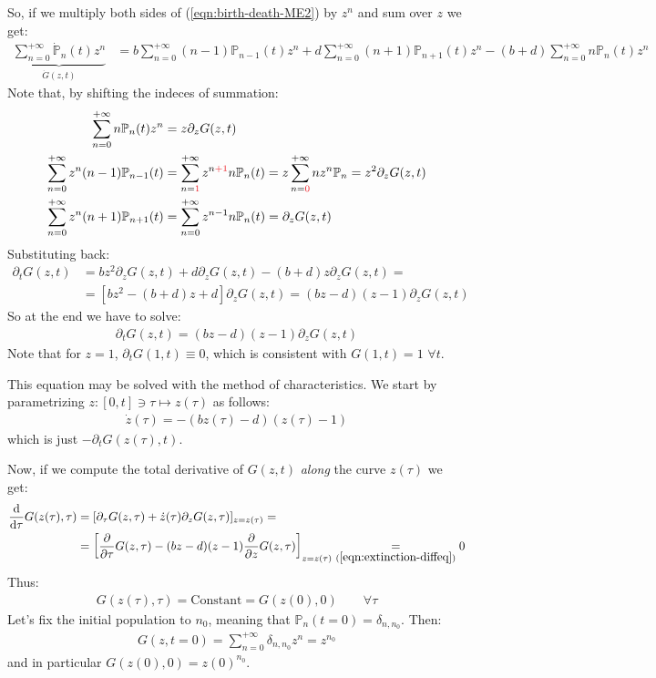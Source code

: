 \documentclass[../../main.tex]{subfiles}
\begin{document}
So, if we multiply both sides of (\ref{eqn:birth-death-ME2}) by $z^n$ and sum over $z$ we get:
\begin{align*}
    \underbrace{\sum_{n=0}^{+\infty} \dot{\mathbb{P}}_n(t) z^n}_{\dot{G}(z,t)}  &= b\sum_{n=0}^{+\infty} (n-1) \mathbb{P}_{n-1}(t) z^n + d\sum_{n=0}^{+\infty} (n+1) \mathbb{P}_{n+1}(t) z^n - (b+d)\sum_{n=0}^{+\infty} n \mathbb{P}_n(t) z^n
\end{align*}
Note that, by shifting the indeces of summation:
\begin{align*}
    \sum_{n=0}^{+\infty} n \mathbb{P}_n(t) z^n &= z\partial_z G(z,t)\\
    \sum_{n=0}^{+\infty} z^n(n-1) \mathbb{P}_{n-1}(t) &= \sum_{n=\textcolor{Red}{1}}^{+\infty} z^{n\textcolor{Red}{+1}} n \mathbb{P}_n(t) = z \sum_{n=\textcolor{Red}{0}}^{+\infty} n z^n \mathbb{P}_n = z^2 \partial_z G(z,t)\\
    \sum_{n=0}^{+\infty} z^n(n+1) \mathbb{P}_{n+1}(t) &= \sum_{n=0}^{+\infty} z^{n-1} n \mathbb{P}_n(t) = \partial_z G(z,t)
\end{align*}
Substituting back:
\begin{align*}
    \partial_t G(z,t) &= b z^2 \partial_z G(z,t) + d \partial_z G(z,t) - (b + d) z \partial_z G(z,t) =\\
    &= [b z^2 - (b+d)z + d]\partial_z G(z,t) = (bz - d)(z-1) \partial_z G(z,t)
\end{align*}
So at the end we have to solve:
\begin{align}\label{eqn:extinction-diffeq}
    \partial_t G(z,t) = (bz - d) (z-1) \partial_z G(z,t)
\end{align}
Note that for $z=1$, $\partial_t G(1,t) \equiv 0$, which is consistent with $G(1,t) = 1$ $\forall t$.


This equation may be solved with the method of characteristics. We start by parametrizing $z\colon [0,t] \ni \tau \mapsto z(\tau)$ as follows:
\begin{align}\label{eqn:z-tau}
    \dot{z}(\tau) = -(b z(\tau) - d) (z(\tau) - 1)
\end{align}
which is just $-\partial_t G(z(\tau),t)$. 

Now, if we compute the total derivative of $G(z,t)$ \textit{along} the curve $z(\tau)$ we get:
\begin{align*}
    \dv{\tau} G(z(\tau), \tau) &= [\partial_\tau G(z,\tau) + \dot{z}(\tau) \partial_z G(z, \tau)]_{z=z(\tau)} =\\
    &= \left[\pdv{\tau} G(z,\tau) - (bz - d)(z-1) \pdv{z} G(z,\tau)\right]_{z = z(\tau)} \underset{(\ref{eqn:extinction-diffeq})}{=} 0
\end{align*} 
Thus:
\begin{align}\label{eqn:G-along-curve}
    G(z(\tau), \tau) = \text{Constant} = G(z(0), 0) \qquad \forall \tau
\end{align}
Let's fix the initial population to $n_0$, meaning that $\mathbb{P}_n(t=0) = \delta_{n,n_0}$. Then:
\begin{align*}
    G(z,t=0) = \sum_{n=0}^{+\infty} \delta_{n, n_0} z^n = z^{n_0}
\end{align*}
and in particular $G(z(0),0) = z(0)^{n_0}$. 
\end{document}

